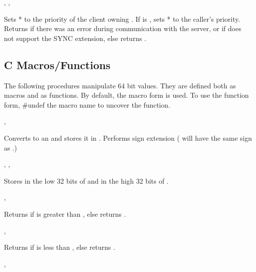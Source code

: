 ,
,
\cendfunctiondecl

Sets * to the priority of the client owning
.  If  is
, sets * to the caller's priority.
Returns  if there was an error
during communication with the server, or if  does not
support the SYNC extension, else returns .
\cendfuncdescription

\subsection*{C Macros/Functions}

The following procedures manipulate 64 bit values.  They are defined
both as macros and as functions.  By default, the macro form is used.
To use the function form, \#undef the macro name to uncover the
function.

,
\cendmacrodecl

Converts  to an  and stores it in
.  Performs sign extension ( will have the
same sign as .)
\cendmacrodescription

,
,
\cendmacrodecl

Stores  in the low 32 bits of  and 
 in the high 32 bits of .
\cendmacrodescription

,
\cendmacrodecl

Returns  if  is greater than ,
else returns .
\cendmacrodescription

,
\cendmacrodecl

Returns  if  is less than ,
else returns .
\cendmacrodescription

,
\cendmacrodecl


